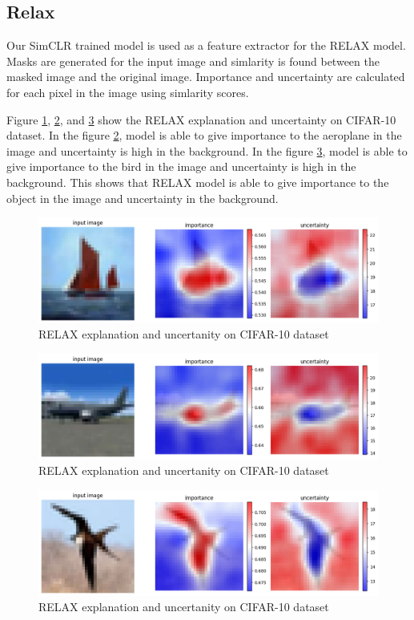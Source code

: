 \subsection{Relax}
Our SimCLR trained model is used as a feature extractor for the RELAX\cite{wickstrom2023relax} model. Masks are generated for the input image and simlarity is found between the masked image and the original image. Importance and uncertainty are calculated for each pixel in the image using simlarity scores.

Figure \ref{fig:result1}, \ref{fig:result2}, and \ref{fig:result3} show the RELAX explanation and uncertainty on CIFAR-10 dataset. In the figure \ref{fig:result2}, model is able to give importance to the aeroplane in the image and uncertainty is high in the background. In the figure \ref{fig:result3}, model is able to give importance to the bird in the image and uncertainty is high in the background. This shows that RELAX model is able to give importance to the object in the image and uncertainty in the background. 
\begin{figure}[h]
    \centering
    \includegraphics[width=1.0\linewidth]{images/Result1.png}
    \caption{RELAX explanation and uncertanity on CIFAR-10 dataset}
    \label{fig:result1}
\end{figure}
\begin{figure}[h]
    \centering
    \includegraphics[width=1.0\linewidth]{images/Result2.png}
    \caption{RELAX explanation and uncertanity on CIFAR-10 dataset}
    \label{fig:result2}
\end{figure}
\begin{figure}[h]
    \centering
    \includegraphics[width=1.0\linewidth]{images/Result3.png}
    \caption{RELAX explanation and uncertanity on CIFAR-10 dataset}
    \label{fig:result3}
\end{figure}

